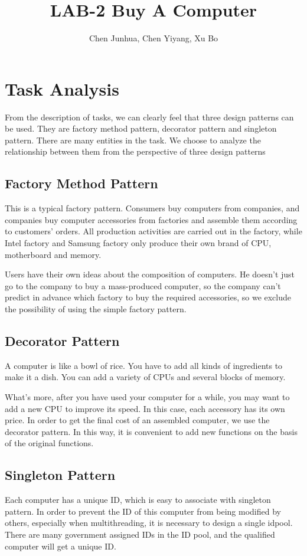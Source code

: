 \documentclass{article}
\title{LAB-2 Buy A Computer}
\author{Chen Junhua, Chen Yiyang, Xu Bo}
\date{}
\begin{document}
	\maketitle

\section{Task Analysis}
    From the description of tasks, we can clearly feel that three design patterns can be used. They are factory method pattern, decorator pattern and singleton pattern. There are many entities in the task. We choose to analyze the relationship between them from the perspective of three design patterns
    
\subsection{Factory Method Pattern}
    This is a typical factory pattern. Consumers buy computers from companies, and companies buy computer accessories from factories and assemble them according to customers' orders. All production activities are carried out in the factory, while Intel factory and Samsung factory only produce their own brand of CPU, motherboard and memory.
    
    Users have their own ideas about the composition of computers. He doesn't just go to the company to buy a mass-produced computer, so the company can't predict in advance which factory to buy the required accessories, so we exclude the possibility of using the simple factory pattern.
    
\subsection{Decorator Pattern}
    A computer is like a bowl of rice. You have to add all kinds of ingredients to make it a dish. You can add a variety of CPUs and several blocks of memory.
    
    What's more, after you have used your computer for a while, you may want to add a new CPU to improve its speed. In this case, each accessory has its own price. In order to get the final cost of an assembled computer, we use the decorator pattern. In this way, it is convenient to add new functions on the basis of the original functions.
    
\subsection{Singleton Pattern}
    Each computer has a unique ID, which is easy to associate with singleton pattern. In order to prevent the ID of this computer from being modified by others, especially when multithreading, it is necessary to design a single
idpool. There are many government assigned IDs in the ID pool, and the qualified computer will get a unique ID.
\end{document}
